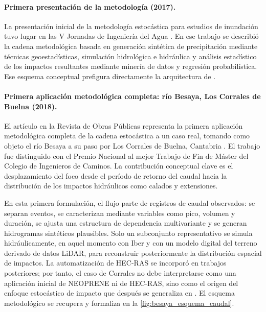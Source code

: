 \paragraph{Primera presentación de la metodología (2017).}
La presentación inicial de la metodología estocástica para estudios de inundación tuvo lugar en las V Jornadas de Ingeniería del Agua \parencite{navas2017jia}. En ese trabajo se describió la cadena metodológica basada en generación sintética de precipitación mediante técnicas geoestadísticas, simulación hidrológica e hidráulica y análisis estadístico de los impactos resultantes mediante minería de datos y regresión probabilística. Ese esquema conceptual prefigura directamente la arquitectura de \hydra.

\paragraph{Primera aplicación metodológica completa: río Besaya, Los Corrales de Buelna (2018).}
El artículo en la Revista de Obras Públicas representa la primera aplicación metodológica completa de la cadena estocástica a un caso real, tomando como objeto el río Besaya a su paso por Los Corrales de Buelna, Cantabria \parencite{navas2018besaya}. El trabajo fue distinguido con el Premio Nacional al mejor Trabajo de Fin de Máster del Colegio de Ingenieros de Caminos. La contribución conceptual clave es el desplazamiento del foco desde el período de retorno del caudal hacia la distribución de los impactos hidráulicos como calados y extensiones.

En esta primera formulación, el flujo parte de registros de caudal observados: se separan eventos, se caracterizan mediante variables como pico, volumen y duración, se ajusta una estructura de dependencia multivariante y se generan hidrogramas sintéticos plausibles. Solo un subconjunto representativo se simula hidráulicamente, en aquel momento con Iber y con un modelo digital del terreno derivado de datos LiDAR, para reconstruir posteriormente la distribución espacial de impactos. La automatización de HEC-RAS se incorporó en trabajos posteriores; por tanto, el caso de Corrales no debe interpretarse como una aplicación inicial de NEOPRENE ni de HEC-RAS, sino como el origen del enfoque estocástico de impacto que después se generaliza en \hydra. El esquema metodológico se recupera y formaliza en la \cref{fig:besaya_esquema_caudal}.

